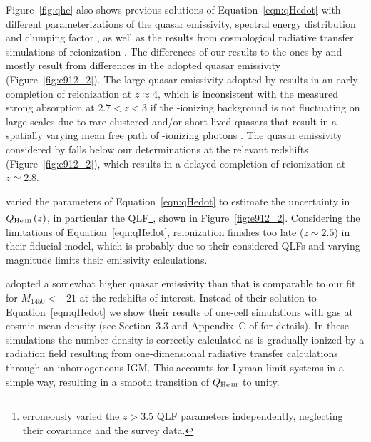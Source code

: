 \documentclass[fleqn,usenatbib]{mnras}
\begin{document}
Figure~\ref{fig:qhe} also shows previous solutions of Equation~\eqref{eqn:qHedot}
with different parameterizations of the quasar emissivity, spectral energy distribution and
clumping factor \citep{2012ApJ...746..125H,2015ApJ...813L...8M,2016ApJ...828...90L,2018arXiv180104931P},
as well as the results from cosmological radiative transfer simulations of  reionization \citep{2009ApJ...694..842M,2014MNRAS.445.4186C}.
The differences of our results to the ones by \citet{2012ApJ...746..125H} and \citet{2015ApJ...813L...8M}
mostly result from differences in the adopted quasar emissivity (Figure~\ref{fig:e912_2}).
The large quasar emissivity adopted by \citet{2015ApJ...813L...8M} results in an early completion of
 reionization at $z\approx 4$, which is inconsistent with the measured strong  absorption
at $2.7<z<3$ \citep{2016ApJ...825..144W,2018MNRAS.473.1416M,2018arXiv180104931P}
if the -ionizing background is not fluctuating on large scales due to rare clustered and/or short-lived
quasars that result in a spatially varying mean free path of -ionizing photons
\citep{2010ApJ...714..355F,2014MNRAS.440.2406M,2014MNRAS.437.1141D,2017MNRAS.465.2886D}.
The quasar emissivity considered by \citet{2012ApJ...746..125H} falls below our determinations at the relevant
redshifts (Figure~\ref{fig:e912_2}), which results in a delayed completion of  reionization at $z\simeq 2.8$.

\citet{2016ApJ...828...90L} varied the parameters of Equation~\eqref{eqn:qHedot} to estimate the uncertainty
in $Q_\ion{He}{iii}\left(z\right)$, in particular the QLF\footnote{\citet{2016ApJ...828...90L} erroneously varied the
$z>3.5$ QLF parameters independently, neglecting their covariance and the survey data.},
shown in Figure~\ref{fig:e912_2}. Considering the limitations of Equation~\eqref{eqn:qHedot},
 reionization finishes too late ($z\sim 2.5$) in their fiducial model, which is probably due to their
considered QLFs and varying magnitude limits their emissivity calculations.

\citet{2018arXiv180104931P} adopted a somewhat higher quasar emissivity than \citet{2012ApJ...746..125H}
that is comparable to our fit for $M_{1450}<-21$ at the redshifts of interest. Instead of their solution to
Equation~\eqref{eqn:qHedot} we show their results of one-cell simulations with gas at cosmic mean density
(see Section~3.3 and Appendix~C of \citealt{2018arXiv180104931P} for details).
In these simulations the  number density is correctly calculated as  is gradually ionized
by a radiation field resulting from one-dimensional radiative transfer calculations through an inhomogeneous IGM.
This accounts for  Lyman limit systems in a simple way, resulting in a smooth transition of $Q_\ion{He}{iii}$ to unity.
\end{document}
